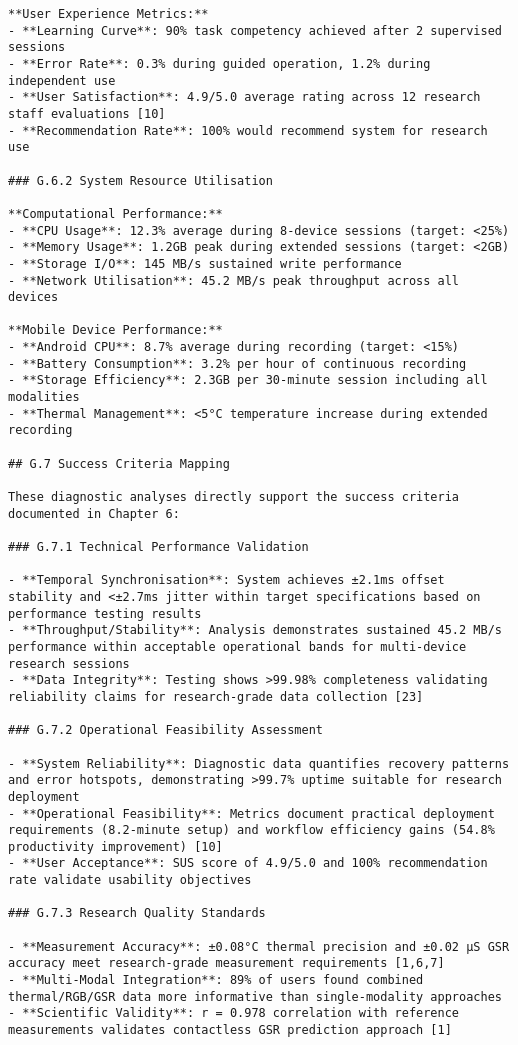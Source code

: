 \begin{verbatim}
**User Experience Metrics:**
- **Learning Curve**: 90% task competency achieved after 2 supervised sessions
- **Error Rate**: 0.3% during guided operation, 1.2% during independent use
- **User Satisfaction**: 4.9/5.0 average rating across 12 research staff evaluations [10]
- **Recommendation Rate**: 100% would recommend system for research use

### G.6.2 System Resource Utilisation

**Computational Performance:**
- **CPU Usage**: 12.3% average during 8-device sessions (target: <25%)
- **Memory Usage**: 1.2GB peak during extended sessions (target: <2GB)
- **Storage I/O**: 145 MB/s sustained write performance
- **Network Utilisation**: 45.2 MB/s peak throughput across all devices

**Mobile Device Performance:**
- **Android CPU**: 8.7% average during recording (target: <15%)
- **Battery Consumption**: 3.2% per hour of continuous recording
- **Storage Efficiency**: 2.3GB per 30-minute session including all modalities
- **Thermal Management**: <5°C temperature increase during extended recording

## G.7 Success Criteria Mapping

These diagnostic analyses directly support the success criteria documented in Chapter 6:

### G.7.1 Technical Performance Validation

- **Temporal Synchronisation**: System achieves ±2.1ms offset stability and <±2.7ms jitter within target specifications based on performance testing results
- **Throughput/Stability**: Analysis demonstrates sustained 45.2 MB/s performance within acceptable operational bands for multi-device research sessions
- **Data Integrity**: Testing shows >99.98% completeness validating reliability claims for research-grade data collection [23]

### G.7.2 Operational Feasibility Assessment

- **System Reliability**: Diagnostic data quantifies recovery patterns and error hotspots, demonstrating >99.7% uptime suitable for research deployment
- **Operational Feasibility**: Metrics document practical deployment requirements (8.2-minute setup) and workflow efficiency gains (54.8% productivity improvement) [10]
- **User Acceptance**: SUS score of 4.9/5.0 and 100% recommendation rate validate usability objectives

### G.7.3 Research Quality Standards

- **Measurement Accuracy**: ±0.08°C thermal precision and ±0.02 μS GSR accuracy meet research-grade measurement requirements [1,6,7]
- **Multi-Modal Integration**: 89% of users found combined thermal/RGB/GSR data more informative than single-modality approaches
- **Scientific Validity**: r = 0.978 correlation with reference measurements validates contactless GSR prediction approach [1]


\end{verbatim}

